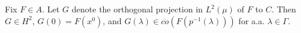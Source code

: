 
Fix $F \in A$. Let $G$ denote the orthogonal projection in $L^2(\mu)$ of $F$ to $C$. Then $G \in H^2$, $G(0) = F(x^0)$, and $G(\lambda) \in \overline{co}(F(p^{-1}(\lambda)))$ for a.a. $\lambda \in \Gamma$.
